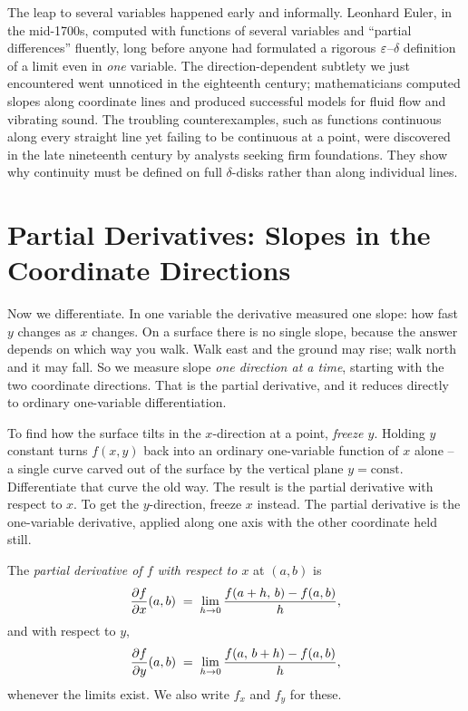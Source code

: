 \begin{marginnotebox}
The leap to several variables happened early and informally. Leonhard Euler, in the
mid-1700s, computed with functions of several variables and ``partial differences'' fluently,
long before anyone had formulated a rigorous $\varepsilon$--$\delta$ definition of a limit even in
\emph{one} variable. The direction-dependent subtlety we just encountered went unnoticed in
the eighteenth century; mathematicians computed slopes along coordinate lines and
produced successful models for fluid flow and vibrating sound. The troubling counterexamples,
such as functions continuous along every straight line yet failing to be continuous at a
point, were discovered in the late nineteenth century by analysts seeking firm
foundations. They show why continuity must be defined on full $\delta$-disks
rather than along individual lines.
\end{marginnotebox}

\section{Partial Derivatives: Slopes in the Coordinate Directions}
\label{ch32:sec-partials}

Now we differentiate. In one variable the derivative measured one slope: how fast $y$ changes
as $x$ changes. On a surface there is no single slope, because the answer depends on which way
you walk. Walk east and the ground may rise; walk north and it may fall. So we measure slope
\emph{one direction at a time}, starting with the two coordinate directions. That is the
partial derivative, and it reduces directly to ordinary one-variable differentiation.

\begin{intuitionbox}
To find how the surface tilts in the $x$-direction at a point, \emph{freeze $y$}. Holding
$y$ constant turns $f(x,y)$ back into an ordinary one-variable function of $x$ alone -- a
single curve carved out of the surface by the vertical plane $y=\text{const}$. Differentiate
that curve the old way. The result is the partial derivative with respect to $x$. To get the
$y$-direction, freeze $x$ instead. The partial derivative is the
one-variable derivative, applied along one axis with the other coordinate held still.
\end{intuitionbox}

\begin{definition}
\label{ch32:def-partial}
The \emph{partial derivative of $f$ with respect to $x$} at $(a,b)$ is
\[
   \frac{\partial f}{\partial x}(a,b) \;=\; \lim_{h\to 0} \frac{f(a+h,\,b) - f(a,b)}{h},
\]
and with respect to $y$,
\[
   \frac{\partial f}{\partial y}(a,b) \;=\; \lim_{h\to 0} \frac{f(a,\,b+h) - f(a,b)}{h},
\]
whenever the limits exist. We also write $f_x$ and $f_y$ for these.
\end{definition}


